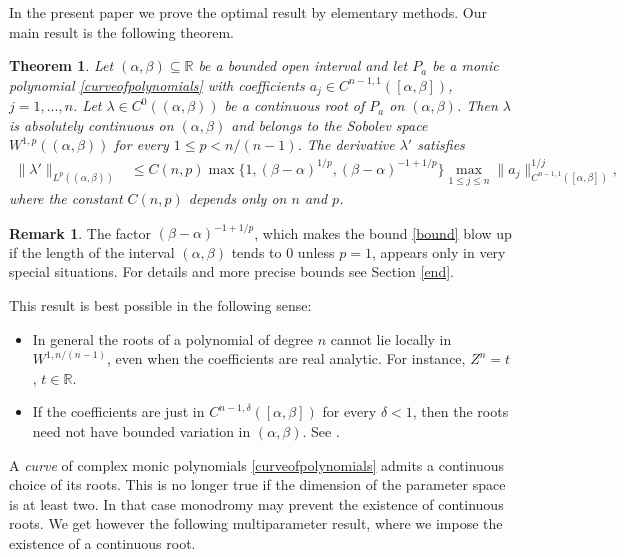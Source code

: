 \documentclass[12pt]{amsart}
\theoremstyle{plain}
\newtheorem{theorem}{Theorem}
\theoremstyle{definition}
\newtheorem*{remark*}{Remark}
\numberwithin{equation}{section}
\begin{document}
In the present paper we prove the optimal result by elementary methods.
Our main result is the following theorem.   

\begin{theorem} \label{main}
  Let $({\alpha},{\beta}) \subseteq {\mathbb{R}}$ be a bounded open interval and let $P_a$   
  be a monic polynomial \eqref{curveofpolynomials} with coefficients $a_j \in C^{n-1,1}([{\alpha},{\beta}])$, $j = 1,\ldots,n$. 
  Let ${\lambda} \in C^0(({\alpha},{\beta}))$ be a continuous root of $P_a$ on $({\alpha},{\beta})$.
  Then ${\lambda}$ is absolutely continuous on $({\alpha},{\beta})$ and belongs to the Sobolev space 
  $W^{1,p}(({\alpha},{\beta}))$ for every $1 \le p < n/(n-1)$. The derivative ${\lambda}'$ satisfies  
  \begin{align} \label{bound} 
   \| {\lambda}' \|_{L^p(({\alpha},{\beta}))}  
   &\le C(n,p) \max\{1, ({\beta}-{\alpha})^{1/p}, ({\beta}-{\alpha})^{-1+1/p}\} 
   \max_{1 \le j \le n} \|a_j\|^{1/j}_{C^{n-1,1}([{\alpha},{\beta}])},
  \end{align}
  where the constant $C(n,p)$ depends only on $n$ and $p$.
\end{theorem}

\begin{remark*}
  The factor $({\beta}-{\alpha})^{-1+1/p}$, which makes the bound \eqref{bound} blow up if the length of the interval $({\alpha},{\beta})$ tends to $0$ 
  unless $p=1$, appears only in very special situations. For details and more precise bounds see Section \ref{end}.
\end{remark*}

This result is best possible in the following sense:
\begin{itemize}
  \item In general the roots of a polynomial of degree $n$ cannot lie locally in $W^{1,n/(n-1)}$, even when the coefficients are real analytic. 
  For instance, $Z^n = t$, $t \in {\mathbb{R}}$. 
  \item If the coefficients are just in $C^{n-1,{\delta}}([{\alpha},{\beta}])$ for every ${\delta}<1$, then the roots need not have bounded variation in 
  $({\alpha},{\beta})$. See \cite[Example 4.4]{GhisiGobbino13}. 
\end{itemize}

A \emph{curve} of complex monic polynomials \eqref{curveofpolynomials} admits a continuous choice of its roots. This is 
no longer true if the dimension of the parameter space is at least two. In that case monodromy may 
prevent the existence of continuous roots. We get however the following multiparameter result, where we 
impose the existence of a continuous root. 
\end{document}

